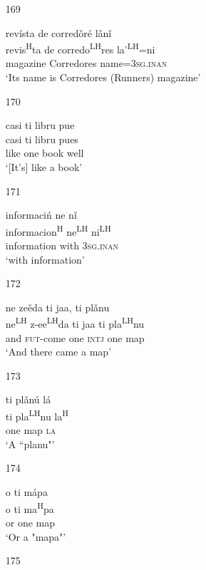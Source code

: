 \begin{itemize}
\item[169]
 
\glll   rev\'{i}sta de corred\v{o}r\'{e} l\v{a}n\v{i}\\
revis\textsuperscript{H}ta de corredo\textsuperscript{LH}res la'\textsuperscript{LH}=ni\\
magazine Corredores name=\textsc{3sg.inan}\\
\glt `Its name is Corredores (Runners) magazine'
 


\item[170]
 
\glll   casi ti libru pue\\
 casi ti libru pues\\
like one book well\\
\glt `[It's] like a book'
 

\item[171]
 
\glll   informaci\'{n} ne n\v{i}\\
informacion\textsuperscript{H} ne\textsuperscript{LH} ni\textsuperscript{LH}\\
information with \textsc{3sg.inan}\\
\glt `with information'
 

\item[172]

\glll   ne ze\v{e}da ti jaa, ti pl\v{a}nu\\
ne\textsuperscript{LH} z-ee\textsuperscript{LH}da  ti jaa ti pla\textsuperscript{LH}nu\\
and \textsc{fut}-come one \textsc{intj} one map\\
\glt `And there came a map'
 

\item[173]
 
\glll   ti pl\v{a}n\'{u} l\'{a}\\
 ti pla\textsuperscript{LH}nu la\textsuperscript{H}\\
one map \textsc{la}\\
\glt `A ``planu"'
 


\item[174]
 
\glll   o ti m\'{a}pa\\
o ti ma\textsuperscript{H}pa\\
or one map\\
\glt `Or a "mapa"'
 


\item[175]
 

\end{itemize}
